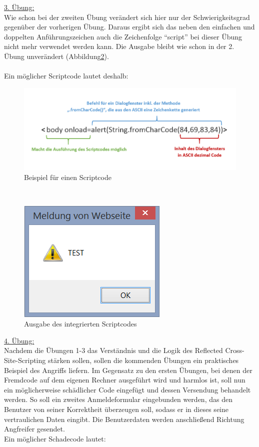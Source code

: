 \newpage

\underline{3. Übung:}
\\
Wie schon bei der zweiten Übung verändert sich hier nur der Schwierigkeitsgrad gegenüber der vorherigen Übung. 
Daraus ergibt sich das neben den einfachen und doppelten Anführungszeichen auch die Zeichenfolge "`script"' bei dieser 
Übung nicht mehr verwendet werden kann. Die Ausgabe bleibt wie schon in der 2. Übung unverändert (Abbildung\ref{fig:xss-reflected-DialogfensterIII}).
\ \\
\ \\
Ein möglicher Scriptcode lautet deshalb:

\begin{figure}[h]
	\centering
	\includegraphics[scale = 0.4]{images/XSS/ScriptcodeIII.jpg}
	\caption{Beispiel für einen Scriptcode}
	\label{fig:xss-reflected-ScriptcodeIII}
\end{figure}

\ \\

\begin{figure}[h]
	\centering
	\includegraphics[scale = 0.4]{images/XSS/alert_meldung.jpg}
	\caption{Ausgabe des integrierten Scriptcodes}
	\label{fig:xss-reflected-DialogfensterIII}
\end{figure}

\newpage

\underline{4. Übung:}
\\
Nachdem die Übungen 1-3 das Verständnis und die Logik des Reflected Cross-Site-Scripting stärken sollen, sollen die kommenden Übungen ein praktisches Beispiel des Angriffs liefern.
Im Gegensatz zu den ersten Übungen, bei denen der Fremdcode auf dem eigenen Rechner ausgeführt wird und harmlos ist, soll nun ein möglicherweise schädlicher Code eingefügt und dessen Versendung behandelt werden.
So soll ein zweites Anmeldeformular eingebunden werden, das den Benutzer von seiner Korrektheit überzeugen soll, sodass er in dieses seine vertraulichen Daten eingibt.
Die Benutzerdaten werden anschließend Richtung Angfreifer gesendet.
\\
Ein möglicher Schadecode lautet:

